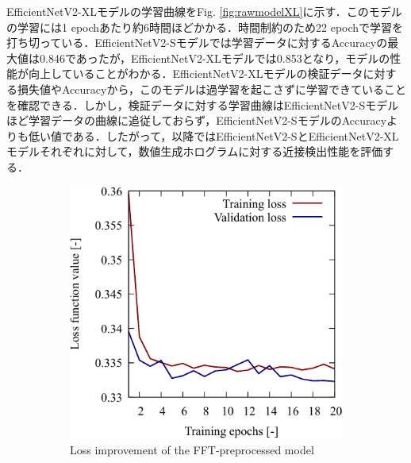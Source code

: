 EfficientNetV2-XLモデルの学習曲線をFig. \ref{fig:rawmodelXL}に示す．このモデルの学習には1 epochあたり約6時間ほどかかる．時間制約のため22 epochで学習を打ち切っている．EfficientNetV2-Sモデルでは学習データに対するAccuracyの最大値は0.846であったが，EfficientNetV2-XLモデルでは0.853となり，モデルの性能が向上していることがわかる．EfficientNetV2-XLモデルの検証データに対する損失値やAccuracyから，このモデルは過学習を起こさずに学習できていることを確認できる．しかし，検証データに対する学習曲線はEfficientNetV2-Sモデルほど学習データの曲線に追従しておらず，EfficientNetV2-SモデルのAccuracyよりも低い値である．したがって，以降ではEfficientNetV2-SとEfficientNetV2-XLモデルそれぞれに対して，数値生成ホログラムに対する近接検出性能を評価する．

\begin{figure}[H]
    \centering
    \begin{subfigure}[t]{0.45\linewidth}
        \includegraphics[width=\linewidth]{./Figure/4_Results/training/loss_fft.pdf}
        \caption{Loss improvement of the FFT-preprocessed model}
        \label{fig:fftmodel:loss}
    \end{subfigure}
    \hfill
    \begin{subfigure}[t]{0.45\linewidth}

\end{subfigure}
\end{figure}

